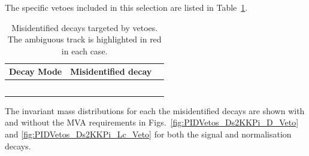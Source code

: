 The specific vetoes included in this selection are listed in Table~\ref{table:pidvetos}. 

\begin{table}[!ht]
\begin{center}
\begin{tabular}{ l l l }
\hline
Decay Mode & Misidentified decay\\
\hline
\decay{\Dsp}{{\color{Red}\Kp}\Km\pip}   & \decay{\Dp}{{\color{Red}\pip}\Km\pip}    \\
                           & \decay{\Lc}{{\color{Red}\Pp}\Km\pip}     \\
                           &                             \\
\decay{\Dsp}{{\color{Red}\Kp}\pim\pip}  & \decay{\Dp}{{\color{Red}\pip}\pim\pip}   \\
                           &                             \\

\hline
\end{tabular}
\caption{Misidentified decays targeted by vetoes. The ambiguous track is highlighted in red in each case.}
\label{table:pidvetos}
\end{center}
\end{table}


The invariant mass distributions for each the misidentified \decay{\Dsp}{\Kp\Km\pip} decays are shown with and without the MVA requirements in Figs.~\ref{fig:PIDVetos_Ds2KKPi_D_Veto} and \ref{fig:PIDVetos_Ds2KKPi_Lc_Veto} for both the signal \decay{\Bp}{\Dsp\phiz} and normalisation \decay{\Bp}{\Dsp\Dzb} decays.



